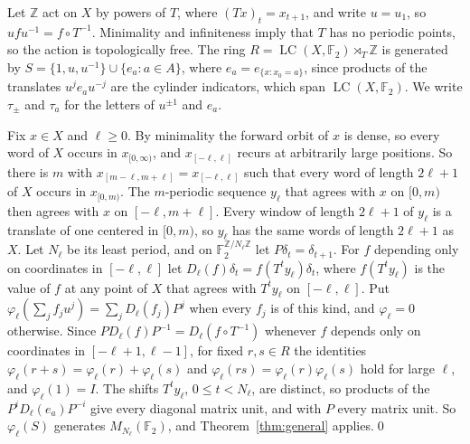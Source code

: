 \documentclass[11pt]{amsart}
\newcommand{\F}{\mathbb F}
\newcommand{\Z}{\mathbb Z}
\newcommand{\LC}{\operatorname{LC}}
\begin{document}
Let $\Z$ act on $X$ by powers of $T$, where $(Tx)_t=x_{t+1}$, and write
$u=u_1$, so $ufu^{-1}=f\circ T^{-1}$. Minimality and infiniteness imply
that $T$ has no periodic points, so the action is topologically free. The
ring $R=\LC(X,\F_2)\rtimes_T\Z$ is generated by
$S=\{1,u,u^{-1}\}\cup\{e_a:a\in A\}$, where $e_a=e_{\{x:x_0=a\}}$, since
products of the translates $u^je_au^{-j}$ are the cylinder indicators,
which span $\LC(X,\F_2)$. We write $\tau_\pm$ and $\tau_a$ for the letters
of $u^{\pm1}$ and $e_a$.

Fix $x\in X$ and $\ell\ge0$. By minimality the forward orbit of $x$ is
dense, so every word of $X$ occurs in $x_{[0,\infty)}$, and
$x_{[-\ell,\ell]}$ recurs at arbitrarily large positions. So there is $m$
with $x_{[m-\ell,m+\ell]}=x_{[-\ell,\ell]}$ such that every word of length
$2\ell+1$ of $X$ occurs in $x_{[0,m)}$. The $m$-periodic sequence $y_\ell$
that agrees with $x$ on $[0,m)$ then agrees with $x$ on $[-\ell,m+\ell]$.
Every window of length $2\ell+1$ of $y_\ell$ is a translate of one
centered in $[0,m)$, so $y_\ell$ has the same words of length $2\ell+1$ as
$X$. Let $N_\ell$ be its least period, and on $\F_2^{\Z/N_\ell\Z}$ let
$P\delta_t=\delta_{t+1}$. For $f$ depending only on coordinates in
$[-\ell,\ell]$ let $D_\ell(f)\delta_t=f(T^ty_\ell)\delta_t$, where
$f(T^ty_\ell)$ is the value of $f$ at any point of $X$ that agrees with
$T^ty_\ell$ on $[-\ell,\ell]$. Put
$\varphi_\ell(\sum_jf_ju^j)=\sum_jD_\ell(f_j)P^j$ when every $f_j$ is of
this kind, and $\varphi_\ell=0$ otherwise. Since
$PD_\ell(f)P^{-1}=D_\ell(f\circ T^{-1})$ whenever $f$ depends only on
coordinates in $[-\ell+1,\ell-1]$, for fixed $r,s\in R$ the identities
$\varphi_\ell(r+s)=\varphi_\ell(r)+\varphi_\ell(s)$ and
$\varphi_\ell(rs)=\varphi_\ell(r)\varphi_\ell(s)$ hold for large $\ell$, and
$\varphi_\ell(1)=I$. The shifts $T^ty_\ell$, $0\le t<N_\ell$, are distinct,
so products of the $P^iD_\ell(e_a)P^{-i}$ give every diagonal matrix unit,
and with $P$ every matrix unit. So $\varphi_\ell(S)$ generates
$M_{N_\ell}(\F_2)$, and Theorem~\ref{thm:general} applies.\qed
\end{document}
